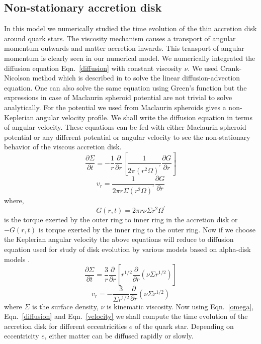 \documentclass[useAMS,usenatbib]{mn2e}
\begin{document}
\subsection{Non-stationary accretion disk}
In this model we numerically studied the time evolution of the thin accretion disk around quark stars. The viscosity mechanism causes a transport of angular momentum outwards and matter accretion inwards. This transport of angular momentum is clearly seen in our numerical model. We numerically integrated the diffusion equation Eqn.~\ref{diffusion} with constant viscosity $\nu$. We used Crank-Nicolson method which is described in \citet{2010A&A...513A..79B} to solve the linear diffusion-advection equation. One can also solve the same equation using Green's function \citep{1974MNRAS.168..603L} but the expressions in case of Maclaurin spheroid potential are not trivial to solve analytically. For the potential we used from Maclaurin spheroids gives a non-Keplerian angular velocity profile. We shall write the diffusion equation in terms of angular velocity. These equations can be fed with either Maclaurin spheroid potential or any different potential or angular velocity to see the non-stationary behavior of the viscous accretion disk.
\begin{equation}
\frac{\partial\Sigma}{\partial t} = -\frac{1}{r}\frac{\partial}{\partial r}\left[\frac{1}{2\pi(r^2\Omega)^\prime}\frac{\partial G}{\partial r}\right]
\label{diffusion}
\end{equation}
\begin{equation}
v_r = \frac{1}{2\pi r\Sigma (r^2\Omega)^\prime}\frac{\partial G}{\partial r}
\label{velocity}
\end{equation}
where,
\begin{equation}
G(r,t) = 2\pi r\nu\Sigma r^2 \Omega^\prime 
\end{equation}
is the torque exerted by the outer ring to inner ring in the accretion disk or $-G(r,t)$ is torque exerted by the inner ring to the outer ring. Now if we choose the Keplerian angular velocity the above equations will reduce to diffusion equation used for study of disk evolution by various models based on alpha-disk models \citep{1974MNRAS.168..603L}.
\begin{equation}
\frac{\partial\Sigma}{\partial t} = \frac{3}{r}\frac{\partial}{\partial r}\left[r^{1/2}\frac{\partial}{\partial r}\left(\nu\Sigma r^{1/2}\right)\right]
\end{equation}
\begin{equation}
v_r = -\frac{3}{\Sigma r^{1/2}}\frac{\partial}{\partial r}\left(\nu\Sigma r^{1/2}\right)
\end{equation}
where $\Sigma$ is the surface density, $\nu$ is kinematic viscosity. Now using Eqn.~\ref{omega}, Eqn.~\ref{diffusion} and Eqn.~\ref{velocity} we shall compute the time evolution of the accretion disk for different eccentricities $e$ of the quark star. Depending on eccentricity $e$, either matter can be diffused rapidly or slowly. 
\end{document}

